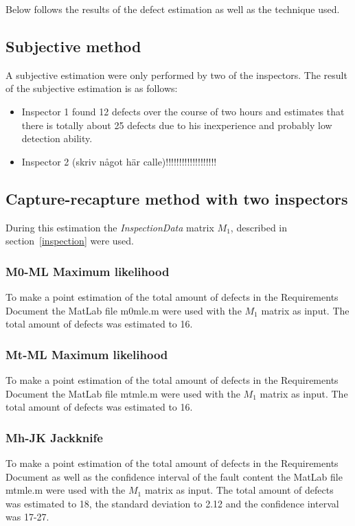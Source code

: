 Below follows the results of the defect estimation as well as the technique used.

\subsection{Subjective method}
A subjective estimation were only performed by two of the inspectors.
The result of the subjective estimation is as follows:
\begin{itemize}
\item Inspector 1 found 12 defects over the course of two hours and estimates that there is totally about 25 defects due to his inexperience and probably low detection ability.
\item Inspector 2 (skriv något här calle)!!!!!!!!!!!!!!!!!!!
\end{itemize}

\subsection{Capture-recapture method with two inspectors}
During this estimation the \textit{InspectionData} matrix $M_{1}$, described in section~\ref{inspection} were used.
\subsubsection{M0-ML Maximum likelihood}
To make a point estimation of the total amount of defects in the Requirements Document the MatLab file m0mle.m were used with the $M_{1}$ matrix as input. The total amount of defects was estimated to 16.
\subsubsection{Mt-ML Maximum likelihood}
To make a point estimation of the total amount of defects in the Requirements Document the MatLab file mtmle.m were used with the $M_{1}$ matrix as input. The total amount of defects was estimated to 16.
\subsubsection{Mh-JK Jackknife}
To make a point estimation of the total amount of defects in the Requirements Document as well as the confidence interval of the fault content the MatLab file mtmle.m were used with the $M_{1}$ matrix as input. The total amount of defects was estimated to 18, the standard deviation to 2.12 and the confidence interval was 17-27.

